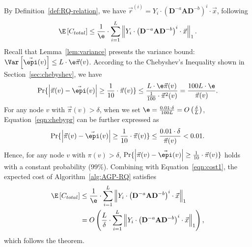 By Definition~\ref{def:RQ-relation}, we have $\vec{r}^{(i)}=Y_i \cdot \left(\mathbf{D}^{-a}\mathbf{A}\mathbf{D}^{-b} \right)^i \cdot \vec{x}$, following  
\begin{equation}\label{eqn:cost1}
\E \left[ C_{total} \right] \le \frac{1}{\e}\cdot \sum_{i=1}^{L} \left\| Y_i \cdot \left(\mathbf{D}^{-a} \mathbf{A} \mathbf{D}^{-b} \right)^i \cdot \vec{x} \right\|_1.
\end{equation}
Recall that Lemma~\ref{lem:variance} presents the variance bound: $\Var\left[\vec{\epi}(v) \right]\le L\cdot \e \vec{\pi}(v)$. According to the Chebyshev's Inequality shown in Section~\ref{sec:chebyshev}, we have
\begin{equation}\label{eqn:chebypr}
	\begin{aligned}
		\Pr \{ \left|\vec{\pi}(v)-\vec{\epi}(v)\right| \ge \frac{1}{10}\cdot \vec{\pi}(v)\} \le \frac{L\cdot \e \vec{\pi}(v)}{\frac{1}{100} \cdot \vec{\pi}^2(v)}=\frac{100L\cdot \e}{\vec{\pi}(v)}. 
	\end{aligned}
\end{equation}
For any node $v$ with $\vec{\pi}(v)> \delta$, when we set $\e=\frac{0.01\cdot \delta}{100L}=O \left( \frac{\delta}{L}\right)$, Equation~\eqref{eqn:chebypr} can be further expressed as 
\vspace{-2mm}
\begin{equation}\nonumber
\vspace{-1mm}
	\begin{aligned}
		\Pr \{ \left|\vec{\pi}(v)-\vec{\epi}(v)\right| \ge \frac{1}{10}\cdot \vec{\pi}(v)\} \le \frac{0.01\cdot \delta}{\vec{\pi}(v)} < 0.01.  
	\end{aligned}
\end{equation}
Hence, for any node $v$ with $\pi(v)>\delta$, $\Pr \{ \left|\vec{\pi}(v)-\vec{\epi}(v)\right| \ge \frac{1}{10}\cdot \vec{\pi}(v)\} $ holds with a constant probability ($99\%$). Combining with Equation~\eqref{eqn:cost1}, the expected cost of Algorithm~\ref{alg:AGP-RQ} satisfies 
\vspace{-2mm}
\begin{equation}\nonumber
\vspace{-1mm}
	\begin{aligned}
		\E \left[ C_{total} \right] 
		&\le \frac{1}{\e}\cdot \sum_{i=1}^{L} \left\| Y_i \cdot \left(\mathbf{D}^{-a}\mathbf{A} \mathbf{D}^{-b} \right)^i \cdot \vec{x} \right\|_1\\
		&=O\left(\frac{L}{\delta}\cdot \sum_{i=1}^{L} \left\| Y_i \cdot \left(\mathbf{D}^{-a}\mathbf{A} \mathbf{D}^{-b} \right)^i \cdot \vec{x} \right\|_1\right), 
	\end{aligned}
\end{equation}
which follows the theorem. 




